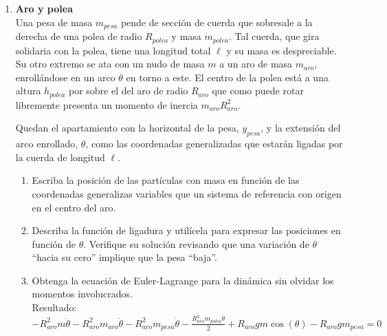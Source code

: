 \documentclass[11pt, spanish, a4paper, twoside]{article}
\begin{document}
\begin{enumerate}
	\item 
	\begin{minipage}[t][6cm]{0.57\textwidth}
		\textbf{Aro y polea}\\
		Una pesa de masa \(m_{pesa}\) pende de sección de cuerda que sobresale a la derecha de una polea de radio \(R_{polea}\) y masa \(m_{polea}\).
		Tal cuerda, que gira solidaria con la polea, tiene una longitud total \(\ell\) y su masa es despreciable.
		Su otro extremo se ata con un nudo de masa \(m\) a un aro de masa \(m_{aro}\), enrollándose en un arco \(\theta\) en torno a este.
		El centro de la polea está a una altura \(h_{polea}\) por sobre el del aro de radio \(R_{aro}\) que como puede rotar libremente presenta un momento de inercia \(m_{aro} R_{aro}^2\).

		Quedan el apartamiento con la horizontal de la pesa, \(y_{pesa}\), y la extensión del arco enrollado, \(\theta\), como las coordenadas generalizadas que estarán ligadas por la cuerda de longitud \(\ell\).
	\end{minipage}
	\begin{minipage}[c][1.5cm][t]{0.2\textwidth}
		
	\end{minipage}
	\begin{enumerate}
		\item Escriba la posición de las partículas con masa en función de las coordenadas generalizas variables que  un sistema de referencia con origen en el centro del aro.
		\item Describa la función de ligadura y utilícela para expresar las posiciones en función de \(\theta\).
		Verifique su solución revisando que una variación de \(\theta\) ``hacia su cero'' implique que la pesa ``baja''. 
		\item Obtenga la ecuación de Euler-Lagrange para la dinámica sin olvidar los momentos involucrados.\\
		Resultado:
		\(
			- R_{aro}^{2} m \ddot{\theta} - R_{aro}^{2} m_{aro} \ddot{\theta} - R_{aro}^{2} m_{pesa} \ddot{\theta} - \frac{R_{aro}^{2} m_{polea} \ddot{\theta}}{2} + R_{aro} g m \cos{\left(\theta \right)} - R_{aro} g m_{pesa} = 0
		\)
	\end{enumerate}



\end{enumerate}
\end{document}
